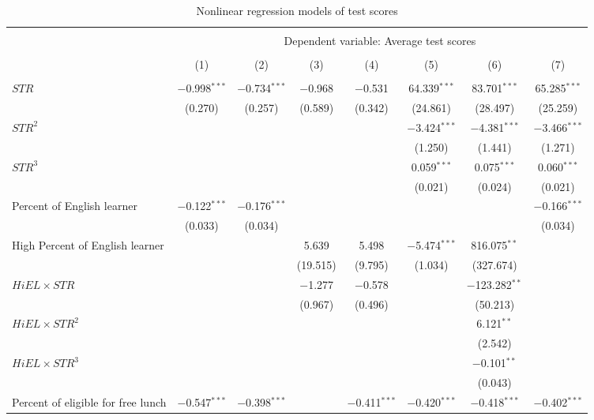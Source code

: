 \documentclass[11pt]{article}
\begin{document}
\begin{table} \centering
  \caption{Nonlinear regression models of test scores}
  \label{tab:tab83}
\begin{tabular}{@{\extracolsep{5pt}}lccccccc}
\\[-1.8ex]\hline
\hline \\[-1.8ex]
 & \multicolumn{7}{c}{Dependent variable: Average test scores} \\
\cline{2-8}
\\[-1.8ex] & (1) & (2) & (3) & (4) & (5) & (6) & (7)\\
\hline \\[-1.8ex]
 $STR$ & $-$0.998$^{***}$ & $-$0.734$^{***}$ & $-$0.968 & $-$0.531 & 64.339$^{***}$ & 83.701$^{***}$ & 65.285$^{***}$ \\
  & (0.270) & (0.257) & (0.589) & (0.342) & (24.861) & (28.497) & (25.259) \\
  $STR^2$ &  &  &  &  & $-$3.424$^{***}$ & $-$4.381$^{***}$ & $-$3.466$^{***}$ \\
  &  &  &  &  & (1.250) & (1.441) & (1.271) \\
  $STR^3$ &  &  &  &  & 0.059$^{***}$ & 0.075$^{***}$ & 0.060$^{***}$ \\
  &  &  &  &  & (0.021) & (0.024) & (0.021) \\
  Percent of English learner & $-$0.122$^{***}$ & $-$0.176$^{***}$ &  &  &  &  & $-$0.166$^{***}$ \\
  & (0.033) & (0.034) &  &  &  &  & (0.034) \\
  High Percent of English learner &  &  & 5.639 & 5.498 & $-$5.474$^{***}$ & 816.075$^{**}$ &  \\
  &  &  & (19.515) & (9.795) & (1.034) & (327.674) &  \\
  $HiEL \times STR$ &  &  & $-$1.277 & $-$0.578 &  & $-$123.282$^{**}$ &  \\
  &  &  & (0.967) & (0.496) &  & (50.213) &  \\
  $HiEL \times STR^2$ &  &  &  &  &  & 6.121$^{**}$ &  \\
  &  &  &  &  &  & (2.542) &  \\
  $HiEL \times STR^3$ &  &  &  &  &  & $-$0.101$^{**}$ &  \\
  &  &  &  &  &  & (0.043) &  \\
  Percent of eligible for free lunch & $-$0.547$^{***}$ & $-$0.398$^{***}$ &  & $-$0.411$^{***}$ & $-$0.420$^{***}$ & $-$0.418$^{***}$ & $-$0.402$^{***}$ \\

\end{tabular}
\end{table}
\end{document}
